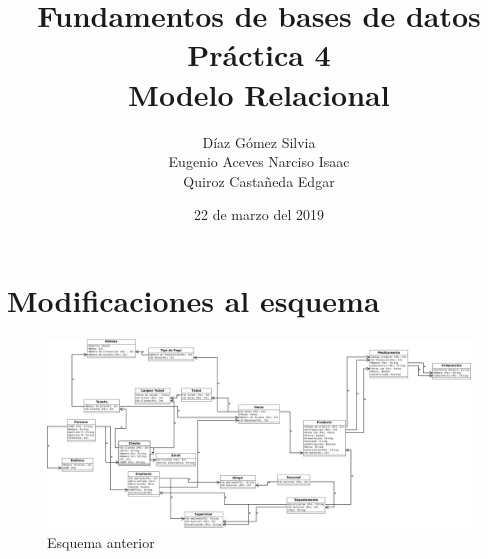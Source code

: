 \documentclass{article}
\begin{document}
    \title{
        Fundamentos de bases de datos \\
        Práctica 4 \\
        Modelo Relacional
    }
    \author{
        Díaz Gómez Silvia \\
        Eugenio Aceves Narciso Isaac \\
        Quiroz Castañeda Edgar
    }
    \date {
        22 de marzo del 2019    
    }
    \maketitle
    \section{Modificaciones al esquema}
    \begin{figure}[H]
    	\centering
        \includegraphics[scale=0.22]{img/practica04.jpeg}
        \caption{Esquema anterior}
    \end{figure}
\end{document}
